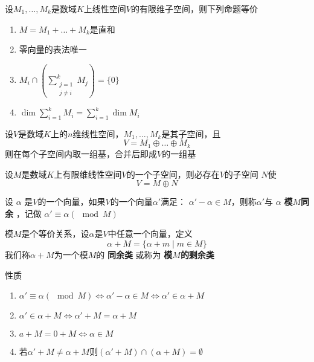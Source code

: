 \documentclass[11pt]{article}
\begin{document}
\begin{theorem}[]
设\(M_1,\dots,M_k\)是数域\(K\)上线性空间\(V\)的有限维子空间，则下列命题等价
\begin{enumerate}
\item \(M=M_1+\dots+M_k\)是直和
\item 零向量的表法唯一
\item \(M_i\cap\left(\displaystyle\sum_{\substack{j=1\\j\neq i}}^kM_j\right)=\{0\}\)
\item \(\dim\sum_{i=1}^kM_i=\sum_{i=1}^k\dim M_i\)
\end{enumerate}
\end{theorem}

\begin{corollary}[]
设\(V\)是数域\(K\)上的\(n\)维线性空间，\(M_1,\dots,M_k\)是其子空间，且
\begin{equation*}
V=M_1\oplus\dots\oplus M_k
\end{equation*}
则在每个子空间内取一组基，合并后即成\(V\)的一组基
\end{corollary}

\begin{proposition}[]
设\(M\)是数域\(K\)上有限维线性空间\(V\)的一个子空间，则必存在\(V\)的子空间
\(N\)使
\begin{equation*}
V=M\oplus N
\end{equation*}
\end{proposition}

\begin{definition}[]
设 \(\alpha\) 是\(V\)的一个向量，如果\(V\)的一个向量\(\alpha'\)满足：
\(\alpha'-\alpha\in M\)，则称\(\alpha'\)与 \(\alpha\) \textbf{模\(M\)同余} ，记做
\(\alpha'\equiv\alpha(\mod M)\)
\end{definition}

模\(M\)是个等价关系，设\(\alpha\)是\(V\)中任意一个向量，定义
\begin{equation*}
\alpha+M=\{\alpha+m\mid m\in M\}
\end{equation*}
我们称\(\alpha+M\)为一个模\(M\)的 \textbf{同余类} 或称为 \textbf{模\(M\)的剩余类}

性质
\begin{enumerate}
\item \(\alpha'\equiv\alpha(\mod M)\Leftrightarrow\alpha'-\alpha\in
      M\Leftrightarrow\alpha'\in\alpha+M\)
\item \(\alpha'\in\alpha+M\Leftrightarrow\alpha'+M=\alpha+M\)
\item \(a+M=0+M\Leftrightarrow\alpha\in M\)
\item 若\(\alpha'+M\neq\alpha+M\)则\((\alpha'+M)\cap(\alpha+M)=\emptyset\)
\end{enumerate}
\end{document}
